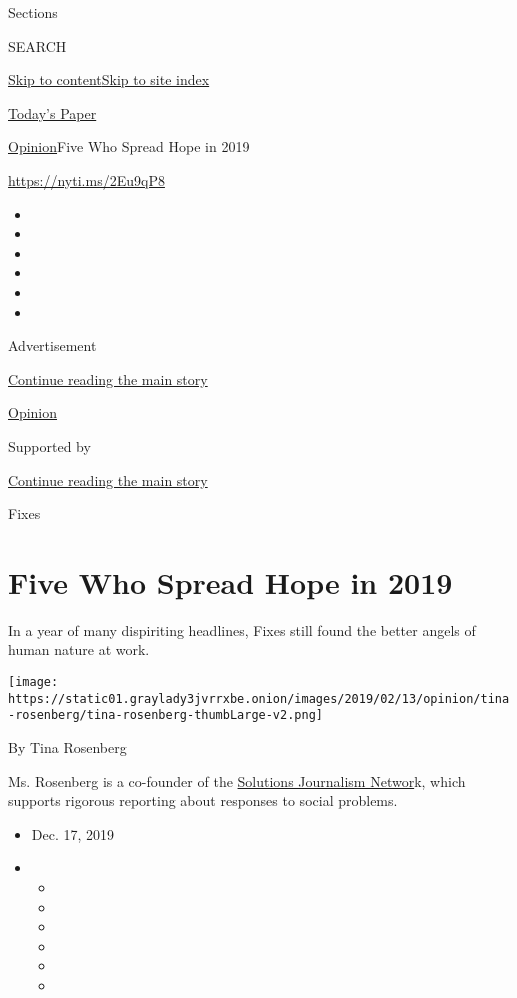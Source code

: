 Sections

SEARCH

\protect\hyperlink{site-content}{Skip to
content}\protect\hyperlink{site-index}{Skip to site index}

\href{https://myaccount.nytimes3xbfgragh.onion/auth/login?response_type=cookie\&client_id=vi}{}

\href{https://www.nytimes3xbfgragh.onion/section/todayspaper}{Today's
Paper}

\href{/section/opinion}{Opinion}\textbar{}Five Who Spread Hope in 2019

\url{https://nyti.ms/2Eu9qP8}

\begin{itemize}
\item
\item
\item
\item
\item
\item
\end{itemize}

Advertisement

\protect\hyperlink{after-top}{Continue reading the main story}

\href{/section/opinion}{Opinion}

Supported by

\protect\hyperlink{after-sponsor}{Continue reading the main story}

Fixes

\hypertarget{five-who-spread-hope-in-2019}{%
\section{Five Who Spread Hope in
2019}\label{five-who-spread-hope-in-2019}}

In a year of many dispiriting headlines, Fixes still found the better
angels of human nature at work.

\texttt{[image: https://static01.graylady3jvrrxbe.onion/images/2019/02/13/opinion/tina-rosenberg/tina-rosenberg-thumbLarge-v2.png]}

By Tina Rosenberg

Ms. Rosenberg is a co-founder of the
\href{http://solutionsjournalism.org}{Solutions Journalism Networ}k,
which supports rigorous reporting about responses to social problems.

\begin{itemize}
\item
  Dec. 17, 2019
\item
  \begin{itemize}
  \item
  \item
  \item
  \item
  \item
  \item
  \end{itemize}
\end{itemize}

